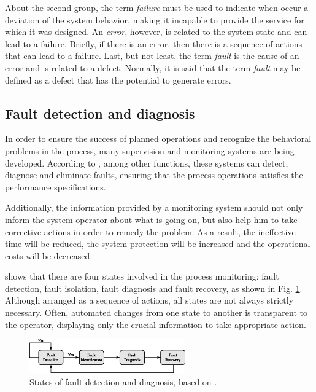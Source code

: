 \documentclass[10pt,fleqn,a4paper]{article}
\begin{document}
About the second group, the term {\it failure} must be used to indicate when
occur a deviation of the system behavior, making it incapable to provide the service
for which it was designed. An {\it error}, however, is related to the system
state and can lead to a failure. Briefly, if there is an error, then there is a
sequence of actions that can lead to a failure. Last, but not least, the term
{\it fault} is the cause of an error and is related to a defect. Normally, it is
said that the term {\it fault} may be defined as a defect that has the potential
to generate errors.

\subsection{Fault detection and diagnosis}
In order to ensure the success of planned operations and recognize the
behavioral problems in the process, many supervision and monitoring systems are
being developed. According to \citet{chiang:2001}, among other functions, these
systems can detect, diagnose and eliminate faults, ensuring that the process
operations satisfies the performance specifications.

Additionally, the information provided by a monitoring system should not only
inform the system operator about what is going on, but also help him to take
corrective actions in order to remedy the problem. As a result, the ineffective
time will be reduced, the system protection will be increased and the
operational costs will be decreased.

\citet{chiang:2001} shows that there are four states involved in the process
monitoring: fault detection, fault isolation, fault diagnosis and fault
recovery, as shown in Fig. \ref{fig:states}. Although arranged as a sequence of
actions, all states are not always strictly necessary. Often, automated changes
from one state to another is transparent to the operator, displaying only the
crucial information to take appropriate action.

\begin{figure}[htb]
\centering
    \includegraphics[width=0.6\textwidth]{imgs/states}
    \caption{States of fault detection and diagnosis, based on
             \citet{chiang:2001}.}
    \label{fig:states}
\end{figure}
\end{document}
